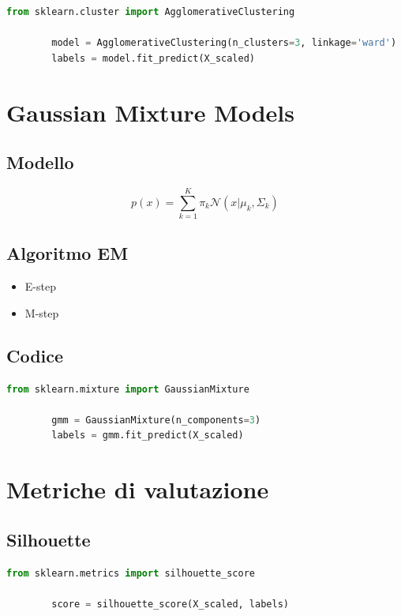 \documentclass[12pt,a4paper]{article}
\begin{document}
	\begin{lstlisting}[language=Python]
		from sklearn.cluster import AgglomerativeClustering
		
		model = AgglomerativeClustering(n_clusters=3, linkage='ward')
		labels = model.fit_predict(X_scaled)
	\end{lstlisting}
	
	\section{Gaussian Mixture Models}
	
	\subsection{Modello}
	
	\begin{equation}
		p(x) = \sum_{k=1}^K \pi_k \mathcal{N}(x|\mu_k,\Sigma_k)
	\end{equation}
	
	\subsection{Algoritmo EM}
	
	\begin{itemize}
		\item E-step
		\item M-step
	\end{itemize}
	
	\subsection{Codice}
	
	\begin{lstlisting}[language=Python]
		from sklearn.mixture import GaussianMixture
		
		gmm = GaussianMixture(n_components=3)
		labels = gmm.fit_predict(X_scaled)
	\end{lstlisting}
	
	\section{Metriche di valutazione}
	
	\subsection{Silhouette}
	
	\begin{lstlisting}[language=Python]
		from sklearn.metrics import silhouette_score
		
		score = silhouette_score(X_scaled, labels)
	\end{lstlisting}
	
\end{document}
